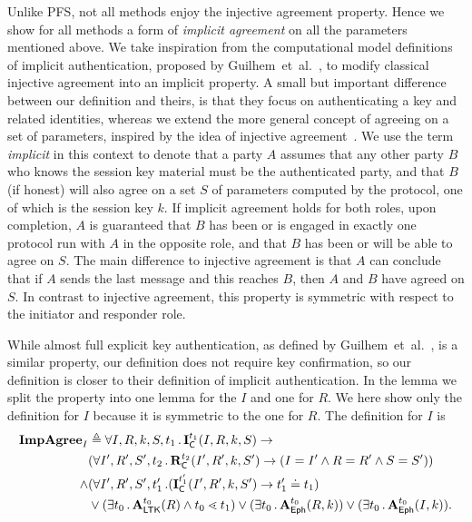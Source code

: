 Unlike PFS, not all \mEdhoc{} methods enjoy the injective agreement property.
%
Hence we show for all methods a form of \emph{implicit agreement} on all the
parameters mentioned above.
%
We take inspiration from the computational model definitions of implicit
authentication, proposed by Guilhem~et~al.~\cite{DBLP:conf/csfw/GuilhemFW20}, to
modify classical injective agreement into an implicit property.
%
A small but important difference between our definition and theirs, is that
they focus on
authenticating a key and related identities, whereas we extend the more general
concept of agreeing on a set of parameters, inspired by the idea of injective
agreement~\cite{DBLP:conf/csfw/Lowe97a}.
%
We use the term \emph{implicit} in this context to denote that a party $A$
assumes that any other party $B$ who knows the session key material must be the
authenticated party, and that $B$ (if honest) will also agree on a set $S$ of
parameters computed by the protocol, one of which is the session key $k$.
%
If implicit agreement holds for both roles, upon completion, $A$ is guaranteed
that $B$ has been or is engaged in exactly one protocol run with $A$ in the
opposite role, and that $B$ has been or will be able to agree on $S$.
%
The main difference to injective agreement is that $A$ can conclude that if
$A$ sends the last message and this reaches $B$, then $A$ and $B$ have agreed
on $S$.
%
In contrast to injective agreement, this property is symmetric with respect to
the initiator and responder role.
%

%
While almost full explicit key authentication, as defined by
Guilhem~et~al.~\cite{DBLP:conf/csfw/GuilhemFW20}, is a similar property, our
definition does not require key confirmation, so our definition is closer to
their definition of implicit authentication.
%
In the \mTamarin{} lemma we split the property into one lemma for the
$I$ and one for $R$.
%
We here show only the definition for $I$ because it is symmetric to the one
for $R$.
%
The definition for $I$ is
\begin{align*}
    \mathbf{ImpAgree}_I& \triangleq
    \forall I, R, k, S, t_1\operatorname{.} \mathbf{I}_{\textsf{C}}^{t_1}(I, R, k, S)
    \rightarrow\\
      &(\forall I', R', S', t_2\operatorname{.} \mathbf{R}_{\textsf{C}}^{t_2}(I', R', k, S') \rightarrow
             (I=I' \land R=R' \land S=S'))\\
      \land &(\forall I', R', S', t_1'\operatorname{.}
        (\mathbf{I}_{\textsf{C}}^{t_1'}(I', R', k, S') \rightarrow t_1' \doteq t_1
        )\\
    &\lor(\exists t_0\operatorname{.} \mathbf{A}_{\textsf{LTK}}^{t_0}(R) \land t_0 \lessdot t_1)
    \lor(\exists t_0\operatorname{.} \mathbf{A}_{\textsf{Eph}}^{t_0}(R, k))
    \lor(\exists t_0\operatorname{.} \mathbf{A}_{\textsf{Eph}}^{t_0}(I, k)).
\end{align*}
%

